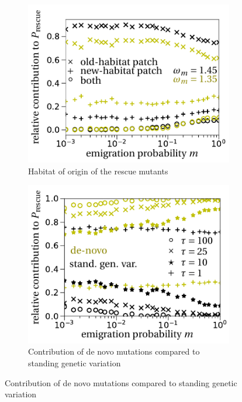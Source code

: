 \documentclass[11pt]{article}
\begin{document}
\begin{figure}[t]
	\centering
		\begin{subfigure}{.5\textwidth}
 		 \centering
 		 \includegraphics[width=\linewidth]{fig6a.pdf}
  		\caption{Habitat of origin of the rescue mutants}
  		\label{fig:sgv_origin}
	\end{subfigure}%
    \begin{subfigure}{.5\textwidth}
 		 \centering
 		 \includegraphics[width=\linewidth]{fig6b.pdf}
  		\caption{Contribution of de novo mutations compared to standing genetic variation}
  		\label{fig:sgv_sgv}
	\end{subfigure}

\end{figure}
\end{document}
